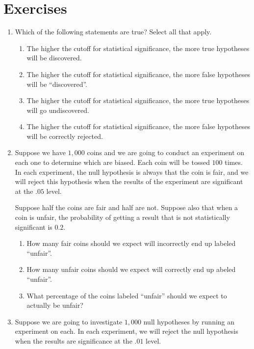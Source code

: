 \documentclass[justified]{tufte-book}
\providecommand{\tightlist}{%
  \setlength{\itemsep}{0pt}\setlength{\parskip}{0pt}}
\theoremstyle{definition}
\theoremstyle{definition}
\theoremstyle{definition}
\theoremstyle{remark}
\begin{document}
\hypertarget{exercises-16}{%
\section*{Exercises}\label{exercises-16}}

\begin{enumerate}
\item
  Which of the following statements are true? Select all that apply.

  \begin{enumerate}
  \def\labelenumii{\alph{enumii}.}
  \tightlist
  \item
    The higher the cutoff for statistical significance, the more true
    hypotheses will be discovered.
  \item
    The higher the cutoff for statistical significance, the more false
    hypotheses will be ``discovered''.
  \item
    The higher the cutoff for statistical significance, the more true
    hypotheses will go undiscovered.
  \item
    The higher the cutoff for statistical significance, the more false
    hypotheses will be correctly rejected.
  \end{enumerate}
\item
  Suppose we have \(1,000\) coins and we are going to conduct an
  experiment on each one to determine which are biased. Each coin will
  be tossed \(100\) times. In each experiment, the null hypothesis is
  always that the coin is fair, and we will reject this hypothesis when
  the results of the experiment are significant at the \(.05\) level.

  Suppose half the coins are fair and half are not. Suppose also that
  when a coin is unfair, the probability of getting a result that is not
  statistically significant is \(0.2\).

  \begin{enumerate}
  \def\labelenumii{\alph{enumii}.}
  \tightlist
  \item
    How many fair coins should we expect will incorrectly end up labeled
    ``unfair''.
  \item
    How many unfair coins should we expect will correctly end up abeled
    ``unfair''.
  \item
    What percentage of the coins labeled ``unfair'' should we expect to
    actually be unfair?
  \end{enumerate}
\item
  Suppose we are going to investigate \(1,000\) null hypotheses by
  running an experiment on each. In each experiment, we will reject the
  null hypothesis when the results are significance at the \(.01\)
  level.


\end{enumerate}
\end{document}

